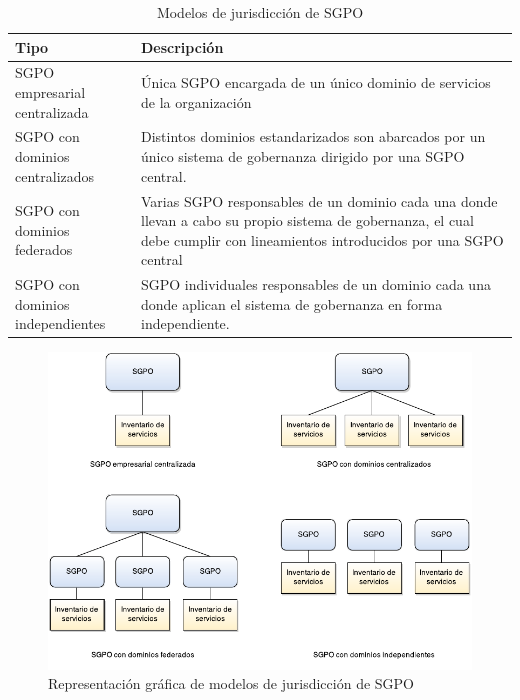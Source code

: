 \documentclass[11pt]{article}
\begin{document}
			\begin{table}[h]
				\begin{tabular}{p{0.25\linewidth} | p{0.75\linewidth}}
					\textbf{Tipo} & \textbf{Descripción} \\
					\hline
					SGPO empresarial centralizada & Única SGPO encargada de un único dominio de servicios de la organización\\
					\hline
					SGPO con dominios centralizados & Distintos dominios estandarizados son abarcados por un único sistema de gobernanza dirigido por una SGPO central.\\
					\hline
					SGPO con dominios federados & Varias SGPO responsables de un dominio cada una donde llevan a cabo su propio sistema de gobernanza, el cual debe cumplir con lineamientos introducidos por una SGPO central\\
					\hline
					SGPO con dominios independientes & SGPO individuales responsables de un dominio cada una donde aplican el sistema de gobernanza en forma independiente.\\
					\hline
				\end{tabular}
				\caption{Modelos de jurisdicción de SGPO}
			    \label{tabla:modelos_sgpo}
			\end{table}

			\begin{figure}[h]
			    \centering
			    \includegraphics[width=\linewidth]{modelos_sgpo}
			    \caption{Representación gráfica de modelos de jurisdicción de SGPO}
			    \label{imagen:modelos_sgpo}
			\end{figure}
\end{document}
